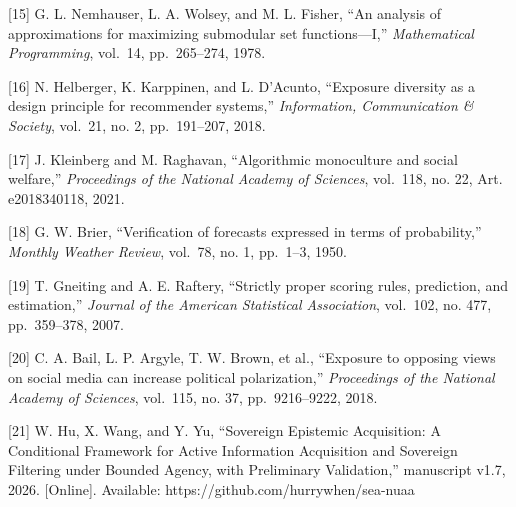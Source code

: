 \documentclass[
  conference,10pt]{IEEEtran}
\begin{document}
{[}15{]} G. L. Nemhauser, L. A. Wolsey, and M. L. Fisher, ``An analysis of approximations for maximizing submodular set functions---I,'' \emph{Mathematical Programming}, vol.~14, pp.~265--274, 1978.

{[}16{]} N. Helberger, K. Karppinen, and L. D'Acunto, ``Exposure diversity as a design principle for recommender systems,'' \emph{Information, Communication \& Society}, vol.~21, no. 2, pp.~191--207, 2018.

{[}17{]} J. Kleinberg and M. Raghavan, ``Algorithmic monoculture and social welfare,'' \emph{Proceedings of the National Academy of Sciences}, vol.~118, no. 22, Art. e2018340118, 2021.

{[}18{]} G. W. Brier, ``Verification of forecasts expressed in terms of probability,'' \emph{Monthly Weather Review}, vol.~78, no. 1, pp.~1--3, 1950.

{[}19{]} T. Gneiting and A. E. Raftery, ``Strictly proper scoring rules, prediction, and estimation,'' \emph{Journal of the American Statistical Association}, vol.~102, no. 477, pp.~359--378, 2007.

{[}20{]} C. A. Bail, L. P. Argyle, T. W. Brown, et al., ``Exposure to opposing views on social media can increase political polarization,'' \emph{Proceedings of the National Academy of Sciences}, vol.~115, no. 37, pp.~9216--9222, 2018.

{[}21{]} W. Hu, X. Wang, and Y. Yu, ``Sovereign Epistemic Acquisition: A Conditional Framework for Active Information Acquisition and Sovereign Filtering under Bounded Agency, with Preliminary Validation,'' manuscript v1.7, 2026. {[}Online{]}. Available: https://github.com/hurrywhen/sea-nuaa

\endgroup
\end{document}
